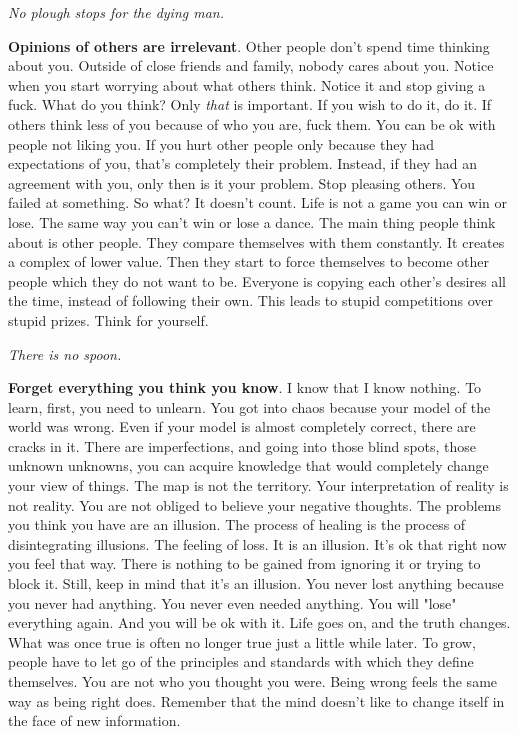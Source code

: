 \documentclass[a4paper,hidelinks]{article}
\begin{document}
\newpage

\begin{center}
\textit{
No plough stops for the dying man.
}
\end{center}

\textbf{Opinions of others are irrelevant}.
Other people don't spend time thinking about you.
Outside of close friends and family, nobody cares about you.
Notice when you start worrying about what others think.
Notice it and stop giving a fuck.
What do you think?
Only \textit{that} is important.
If you wish to do it, do it.
If others think less of you because of who you are, fuck them.
You can be ok with people not liking you.
If you hurt other people only because they had expectations of you, that's completely their problem.
Instead, if they had an agreement with you, only then is it your problem.
Stop pleasing others.
You failed at something.
So what?
It doesn't count.
Life is not a game you can win or lose.
The same way you can't win or lose a dance.
The main thing people think about is other people.
They compare themselves with them constantly.
It creates a complex of lower value.
Then they start to force themselves to become other people which they do not want to be.
Everyone is copying each other's desires all the time, instead of following their own.
This leads to stupid competitions over stupid prizes.
Think for yourself.

\newpage

\begin{center}
\textit{
There is no spoon.
}
\end{center}

\textbf{Forget everything you think you know}.
I know that I know nothing.
To learn, first, you need to unlearn.
You got into chaos because your model of the world was wrong.
Even if your model is almost completely correct, there are cracks in it.
There are imperfections, and going into those blind spots, those unknown unknowns, you can acquire knowledge that would completely change your view of things.
The map is not the territory.
Your interpretation of reality is not reality.
You are not obliged to believe your negative thoughts.
The problems you think you have are an illusion.
The process of healing is the process of disintegrating illusions.
The feeling of loss.
It is an illusion.
It's ok that right now you feel that way.
There is nothing to be gained from ignoring it or trying to block it.
Still, keep in mind that it's an illusion.
You never lost anything because you never had anything.
You never even needed anything.
You will "lose" everything again.
And you will be ok with it.
Life goes on, and the truth changes.
What was once true is often no longer true just a little while later.
To grow, people have to let go of the principles and standards with which they define themselves.
You are not who you thought you were.
Being wrong feels the same way as being right does.
Remember that the mind doesn't like to change itself in the face of new information.
\end{document}
